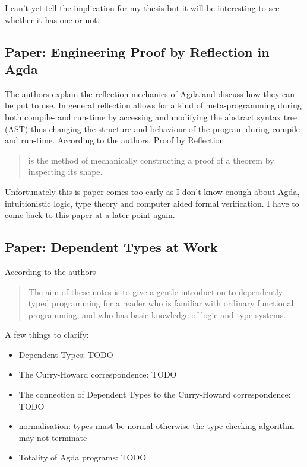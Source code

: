 I can't yet tell the implication for my thesis but it will be interesting to see whether it has one or not.

\subsection*{Paper: Engineering Proof by Reflection in Agda \cite{vanderWalt2013}}
The authors explain the reflection-mechanics of Agda and discuss how they can be put to use.
In general reflection allows for a kind of meta-programming during both compile- and run-time by accessing and modifying the abstract syntax tree (AST) thus changing the structure and behaviour of the program during compile- and run-time. According to the authors, Proof by Reflection
\begin{quote}
is the method of mechanically constructing a proof of a theorem by inspecting its shape.
\end{quote}

Unfortunately this is paper comes too early as I don't know enough about Agda, intuitionistic logic, type theory and computer aided formal verification. I have to come back to this paper at a later point again.

\subsection*{Paper: Dependent Types at Work \cite{Bove2009}}
According to the authors

\begin{quote}
The aim of these notes is to give a gentle introduction to dependently typed programming for a reader who is familiar with ordinary functional programming, and who has basic knowledge of logic and type systems.
\end{quote}

A few things to clarify:

\begin{itemize}
\item Dependent Types: TODO
\item The Curry-Howard correspondence: TODO
\item The connection of Dependent Types to the Curry-Howard correspondence: TODO
\item normalisation: types must be normal otherwise the type-checking algorithm may not terminate
\item Totality of Agda programs: TODO
\end{itemize}
